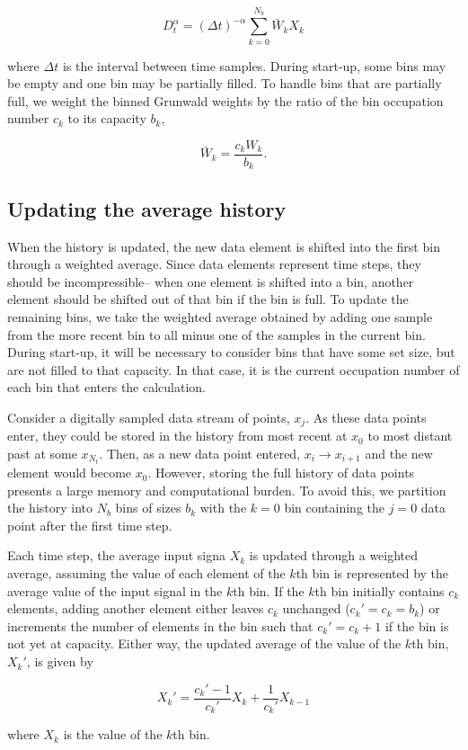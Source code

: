 \begin{equation}
D^\alpha_t = \displaystyle(\Delta t)^{-\alpha}\sum\limits_{k=0}^{N_b}\bar{W}_kX_k
\label{avgSimpleGrunwald}
\end{equation}

\noindent where $\Delta t$ is the interval between time samples. During start-up, some bins may be empty and one bin may be partially filled. To handle bins that are partially full, we weight the binned Grunwald weights by the ratio of the bin occupation number $c_k$ to its capacity $b_k$, 

\begin{equation}
\bar{W}_k= \frac{c_k W_k}{b_k}.
\label{Wbar}
\end{equation} 

\subsection{Updating the average history}

When the history is updated, the new data element is shifted into the first bin through a weighted average. Since data elements represent time steps, they should be incompressible-- when one element is shifted into a bin, another element should be shifted out of that bin if the bin is full. To update the remaining bins, we take the weighted average obtained by adding one sample from the more recent bin to all minus one of the samples in the current bin. During start-up, it will be necessary to consider bins that have some set size, but are not filled to that capacity. In that case, it is the current occupation number of each bin that enters the calculation. 

Consider a digitally sampled data stream of points, $x_j$. As these data points enter, they could be stored in the history from most recent at $x_0$ to most distant past at some $x_{N_t}$.  Then, as a new data point entered, $x_i\rightarrow x_{i+1}$ and the new element would become $x_0$. However, storing the full history of data points presents a large memory and computational burden. To avoid this, we partition the history into $N_b$ bins of sizes $b_k$ with the $k=0$ bin containing the $j=0$ data point after the first time step. 

Each time step, the average input signa $X_k$ is updated through a weighted average, assuming the value of each element of the $k$th bin is represented by the average value of the input signal in the $k$th bin. If the $k$th bin initially contains $c_k$
elements, adding another element either leaves $c_k$ unchanged
($c_k\prime=c_k=b_k$) or increments the number of elements in the bin such
that $c_k\prime = c_k + 1$ if the bin is not yet at capacity. Either way, the updated average of the
value of the $k$th bin, $X_k\prime$, is given by

\begin{equation}
X_k\prime = \frac{c_k\prime-1}{c_k\prime}X_k + \frac{1}{c_k\prime}X_{k-1}
\label{avgShiftReg}
\end{equation}

\noindent where $X_k$ is the value of the $k$th bin.








